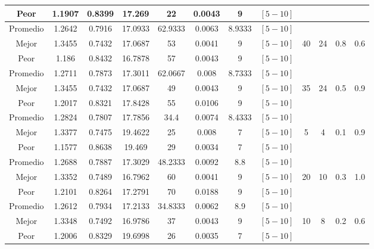 \begin{table}[h!]
\begin{center}
\begin{tabular}{|c|c|c|c|c|c|c|c|c|c|c|c|}
            \cline{1-8}
            Peor & 1.1907 & 0.8399  & 17.269 & 22 & 0.0043 & 9 & $[5-10]$ &  &  &  & \\
        \hline
        \hline
            Promedio  & 1.2642 & 0.7916 & 17.0933 & 62.9333 & 0.0063 & 8.9333 & $[5-10]$ &  &  &  & \\
            \cline{1-8}
            Mejor & 1.3455 & 0.7432  & 17.0687 & 53 & 0.0041 & 9 & $[5-10]$ & 40 & 24 & 0.8 & 0.6\\
            \cline{1-8}
            Peor & 1.186 & 0.8432  & 16.7878 & 57 & 0.0043 & 9 & $[5-10]$ &  &  &  & \\
        \hline
        \hline
            Promedio  & 1.2711 & 0.7873 & 17.3011 & 62.0667 & 0.008 & 8.7333 & $[5-10]$ &  &  &  & \\
            \cline{1-8}
            Mejor & 1.3455 & 0.7432  & 17.0687 & 49 & 0.0043 & 9 & $[5-10]$ & 35 & 24 & 0.5 & 0.9\\
            \cline{1-8}
            Peor & 1.2017 & 0.8321  & 17.8428 & 55 & 0.0106 & 9 & $[5-10]$ &  &  &  & \\
        \hline
        \hline
            Promedio  & 1.2824 & 0.7807 & 17.7856 & 34.4 & 0.0074 & 8.4333 & $[5-10]$ &  &  &  & \\
            \cline{1-8}
            Mejor & 1.3377 & 0.7475  & 19.4622 & 25 & 0.008 & 7 & $[5-10]$ & 5 & 4 & 0.1 & 0.9\\
            \cline{1-8}
            Peor & 1.1577 & 0.8638  & 19.469 & 29 & 0.0034 & 7 & $[5-10]$ &  &  &  & \\
        \hline
        \hline
            Promedio  & 1.2688 & 0.7887 & 17.3029 & 48.2333 & 0.0092 & 8.8 & $[5-10]$ &  &  &  & \\
            \cline{1-8}
            Mejor & 1.3352 & 0.7489  & 16.7962 & 60 & 0.0041 & 9 & $[5-10]$ & 20 & 10 & 0.3 & 1.0\\
            \cline{1-8}
            Peor & 1.2101 & 0.8264  & 17.2791 & 70 & 0.0188 & 9 & $[5-10]$ &  &  &  & \\
        \hline
        \hline
            Promedio  & 1.2612 & 0.7934 & 17.2133 & 34.8333 & 0.0062 & 8.9 & $[5-10]$ &  &  &  & \\
            \cline{1-8}
            Mejor & 1.3348 & 0.7492  & 16.9786 & 37 & 0.0043 & 9 & $[5-10]$ & 10 & 8 & 0.2 & 0.6\\
            \cline{1-8}
            Peor & 1.2006 & 0.8329  & 19.6998 & 26 & 0.0035 & 7 & $[5-10]$ &  &  &  & \\
        \hline

\end{tabular}
\end{center}
\end{table}
